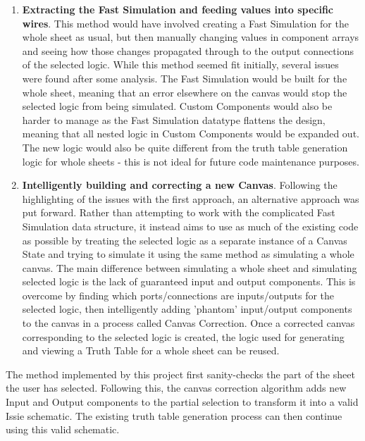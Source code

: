 \begin{enumerate}
    \item \textbf{Extracting the Fast Simulation and feeding values into specific wires}. This method would have involved creating a Fast Simulation for the whole sheet as usual, but then manually changing values in component arrays and seeing how those changes propagated through to the output connections of the selected logic. While this method seemed fit initially, several issues were found after some analysis. The Fast Simulation would be built for the whole sheet, meaning that an error elsewhere on the canvas would stop the selected logic from being simulated. Custom Components would also be harder to manage as the Fast Simulation datatype flattens the design, meaning that all nested logic in Custom Components would be expanded out. The new logic would also be quite different from the truth table generation logic for whole sheets - this is not ideal for future code maintenance purposes.
    \item \textbf{Intelligently building and correcting a new Canvas}. Following the highlighting of the issues with the first approach, an alternative approach was put forward. Rather than attempting to work with the complicated Fast Simulation data structure, it instead aims to use as much of the existing code as possible by treating the selected logic as a separate instance of a Canvas State and trying to simulate it using the same method as simulating a whole canvas. The main difference between simulating a whole sheet and simulating selected logic is the lack of guaranteed input and output components. This is overcome by finding which ports/connections are inputs/outputs for the selected logic, then intelligently adding 'phantom' input/output components to the canvas in a process called Canvas Correction. Once a corrected canvas corresponding to the selected logic is created, the logic used for generating and viewing a Truth Table for a whole sheet can be reused.
\end{enumerate}

The method implemented by this project first sanity-checks the part of the sheet the user has selected. Following this, the canvas correction algorithm adds new Input and Output components to the partial selection to transform it into a valid Issie schematic. The existing truth table generation process can then continue using this valid schematic.

